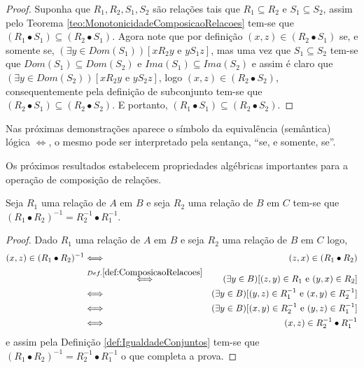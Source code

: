 \begin{proof}
	Suponha que $R_1, R_2, S_1, S_2$ são relações tais que $R_1 \subseteq R_2$ e $S_1 \subseteq S_2$, assim pelo Teorema \ref{teo:MonotonicidadeComposicaoRelacoes} tem-se que $(R_1 \bullet S_1) \subseteq (R_2 \bullet S_1)$. Agora note que por definição $(x, z) \in (R_2 \bullet S_1)$ se, e somente se, $(\exists y \in Dom(S_1))[x\mathrel{R_2}y \text{ e } y\mathrel{S_1}z]$, mas uma vez que $S_1 \subseteq S_2$ tem-se que $Dom(S_1) \subseteq Dom(S_2)$ e $Ima(S_1) \subseteq Ima(S_2)$ e assim é claro que $(\exists y \in Dom(S_2))[x\mathrel{R_2}y \text{ e } y\mathrel{S_2}z]$, logo $(x, z) \in (R_2 \bullet S_2)$, consequentemente pela definição de subconjunto tem-se que $(R_2 \bullet S_1) \subseteq (R_2 \bullet S_2)$. E portanto, $(R_1 \bullet S_1) \subseteq (R_2 \bullet S_2)$.
\end{proof}

\begin{nota}
  Nas próximas demonstrações aparece o símbolo da equivalência (semântica) lógica $\Longleftrightarrow$, o mesmo pode ser interpretado pela sentança, ``se, e somente, se''.
\end{nota}

Os próximos resultados estabelecem propriedades algébricas importantes para a operação de composição de relações.

\begin{teorema}\label{teo:PseudoMorganRelacoes}
	Seja $R_1$ uma relação de $A$ em $B$ e seja $R_2$ uma relação de $B$ em $C$ tem-se que $(R_1 \bullet R_2)^{-1} = R_2^{-1} \bullet R_1^{-1}$.
\end{teorema}

\begin{proof}
	Dado $R_1$ uma relação de $A$ em $B$ e seja $R_2$ uma relação de $B$ em $C$ logo, 
	\begin{eqnarray*}
		(x, z) \in (R_1 \bullet R_2)^{-1} & \Longleftrightarrow & (z, x) \in (R_1 \bullet R_2)\\
		& \stackrel{Def. \ref{def:ComposicaoRelacoes}}{\Longleftrightarrow }& (\exists y \in B)[(z, y) \in R_1 \text{ e } (y, x) \in R_2]\\
		& \Longleftrightarrow & (\exists y \in B)[(y, z) \in R_1^{-1} \text{ e } (x, y) \in R_2^{-1}]\\
		& \Longleftrightarrow & (\exists y \in B)[(x, y) \in R_2^{-1} \text{ e }(y, z) \in R_1^{-1} ]\\
		& \Longleftrightarrow & (x, z) \in R_2^{-1} \bullet R_1^{-1}
	\end{eqnarray*} 
	e assim pela Definição \ref{def:IgualdadeConjuntos} tem-se que $(R_1 \bullet R_2)^{-1} = R_2^{-1} \bullet R_1^{-1}$ o que completa a prova.
\end{proof}

